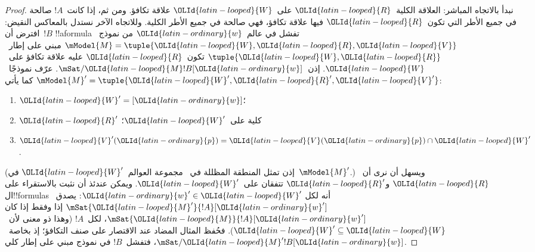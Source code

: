\documentclass[../../../include/open-logic-section]{subfiles}
\begin{document}
\begin{proof}
  نبدأ بالاتجاه المباشر: العلاقة الكلية~$\OLId{latin-looped}{R}$ على~$\OLId{latin-looped}{W}$ علاقة تكافؤ.
  ومن ثم، إذا كانت~$!A$ صالحة في جميع الأطر التي تكون~$\OLId{latin-looped}{R}$ فيها علاقة
  تكافؤ، فهي صالحة في جميع الأطر الكلية. وللاتجاه الآخر نستدل
  بالمعاكس النقيض: افترض أن~$!B$ !!a{formula} تفشل في عالم~$\OLId{latin-ordinary}{w}$ من
  نموذج~$\mModel{M} = \tuple{\OLId{latin-looped}{W}, \OLId{latin-looped}{R}, \OLId{latin-looped}{V}}$ مبني على إطار~$\tuple{\OLId{latin-looped}{W},\OLId{latin-looped}{R}}$
  تكون~$\OLId{latin-looped}{R}$ عليه علاقة تكافؤ على~$\OLId{latin-looped}{W}$. إذن~$\mSat/{\OLId{latin-looped}{M}}{!B}[\OLId{latin-ordinary}{w}]$. عرّف
  نموذجًا~$\mModel{M}' = \tuple{\OLId{latin-looped}{W}', \OLId{latin-looped}{R}', \OLId{latin-looped}{V}'}$ كما يأتي:
  \begin{enumerate}
  \item $\OLId{latin-looped}{W}' = [\OLId{latin-ordinary}{w}]$؛
  \item $\OLId{latin-looped}{R}'$ كلية على~$\OLId{latin-looped}{W}'$؛
  \item $\OLId{latin-looped}{V}'(\OLId{latin-ordinary}{p}) = \OLId{latin-looped}{V}(\OLId{latin-ordinary}{p}) \cap \OLId{latin-looped}{W}'$.
  \end{enumerate}
  (إذن تمثل المنطقة المظللة في~ مجموعة
  العوالم~$\OLId{latin-looped}{W}'$ في~$\mModel{M}'$.) ويسهل أن نرى أن~$\OLId{latin-looped}{R}$ و$\OLId{latin-looped}{R}'$ تتفقان
  على~$\OLId{latin-looped}{W}'$. ويمكن عندئذ أن نثبت بالاستقراء على ال!!{formula}s أنه لكل
  $\OLId{latin-ordinary}{w}' \in \OLId{latin-looped}{W}'$: يصدق~$\mSat{\OLId{latin-looped}{M}'}{!A}[\OLId{latin-ordinary}{w}']$ إذا وفقط إذا كان
  $\mSat{\OLId{latin-looped}{M}}{!A}[\OLId{latin-ordinary}{w}']$، لكل~$!A$ (وهذا ذو معنى لأن~$\OLId{latin-looped}{W}' \subseteq \OLId{latin-looped}{W}$).
  فحُفظ المثال المضاد عند الاقتصار على صنف التكافؤ؛ إذ بخاصة~$\mSat/{\OLId{latin-looped}{M}'}{!B}[\OLId{latin-ordinary}{w}]$، فتفشل~$!B$ في نموذج مبني على إطار كلي.
\end{proof}
\end{document}
